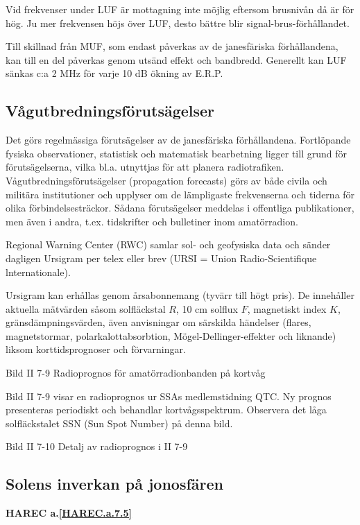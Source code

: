 Vid frekvenser under LUF är mottagning inte möjlig eftersom brusnivån
då är för hög.  Ju mer frekvensen höjs över LUF, desto bättre blir
signal-brus-förhållandet.

Till skillnad från MUF, som endast påverkas av de janesfäriska
förhållandena, kan till en del påverkas genom utsänd effekt och
bandbredd. Generellt kan LUF sänkas c:a 2 MHz för varje 10 dB ökning
av E.R.P.

\subsection{Vågutbredningsförutsägelser}

Det görs regelmässiga förutsägelser av de janesfäriska
förhållandena. Fortlöpande fysiska observationer, statistisk och
matematisk bearbetning ligger till grund för förutsägelserna, vilka
bl.a. utnyttjas för att planera radiotrafiken.
Vågutbredningsförutsägelser (propagation forecasts) görs av både
civila och militära institutioner och upplyser om de lämpligaste
frekvenserna och tiderna för olika förbindelsesträckor. Sådana
förutsägelser meddelas i offentliga publikationer, men även i andra,
t.ex. tidskrifter och bulletiner inom amatörradion.

Regional Warning Center (RWC) samlar sol- och geofysiska data och
sänder dagligen Ursigram per telex eller brev (URSI = Union
Radio-Scientifique lnternationale).

Ursigram kan erhållas genom årsabonnemang (tyvärr till högt pris). De
innehåller aktuella mätvärden såsom solfläckstal \(R\), 10 cm solflux
\(F\), magnetiskt index \(K\), gränsdämpningsvärden, även anvisningar
om särskilda händelser (flares, magnetstormar, polarkalottabsorbtion,
Mögel-Dellinger-effekter och liknande) liksom korttidsprognoser och
förvarningar.

Bild II 7-9 Radioprognos för amatörradionbanden på kortvåg

Bild II 7-9 visar en radioprognos ur SSAs medlemstidning QTC. Ny
prognos presenteras periodiskt och behandlar
kortvågsspektrum. Observera det låga solfläckstalet SSN (Sun Spot
Number) på denna bild.

Bild II 7-10 Detalj av radioprognos i II 7-9

\subsection{Solens inverkan på jonosfären}
\textbf{
HAREC a.\ref{HAREC.a.7.5}\label{myHAREC.a.7.5}
}

